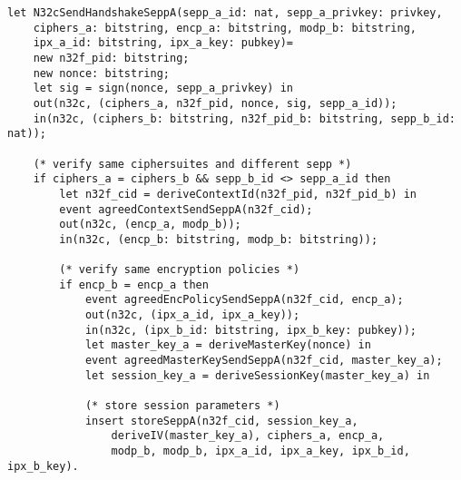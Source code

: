 \begin{lstlisting}[caption={Definition of the N32-c handshake process},label={lst:n32c-handshake},firstnumber=253]
let N32cSendHandshakeSeppA(sepp_a_id: nat, sepp_a_privkey: privkey,
    ciphers_a: bitstring, encp_a: bitstring, modp_b: bitstring,
    ipx_a_id: bitstring, ipx_a_key: pubkey)=
    new n32f_pid: bitstring;
    new nonce: bitstring;
    let sig = sign(nonce, sepp_a_privkey) in
    out(n32c, (ciphers_a, n32f_pid, nonce, sig, sepp_a_id));
    in(n32c, (ciphers_b: bitstring, n32f_pid_b: bitstring, sepp_b_id: nat));

    (* verify same ciphersuites and different sepp *)
    if ciphers_a = ciphers_b && sepp_b_id <> sepp_a_id then
        let n32f_cid = deriveContextId(n32f_pid, n32f_pid_b) in
        event agreedContextSendSeppA(n32f_cid);
        out(n32c, (encp_a, modp_b));
        in(n32c, (encp_b: bitstring, modp_b: bitstring));

        (* verify same encryption policies *)
        if encp_b = encp_a then
            event agreedEncPolicySendSeppA(n32f_cid, encp_a);
            out(n32c, (ipx_a_id, ipx_a_key));
            in(n32c, (ipx_b_id: bitstring, ipx_b_key: pubkey));
            let master_key_a = deriveMasterKey(nonce) in
            event agreedMasterKeySendSeppA(n32f_cid, master_key_a);
            let session_key_a = deriveSessionKey(master_key_a) in

            (* store session parameters *)
            insert storeSeppA(n32f_cid, session_key_a,
                deriveIV(master_key_a), ciphers_a, encp_a,
                modp_b, modp_b, ipx_a_id, ipx_a_key, ipx_b_id, ipx_b_key).
\end{lstlisting}

